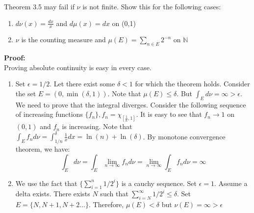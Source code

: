 \documentclass[notoc]{tufte-book}
\begin{document}
\begin{tcolorbox}[colback=c4,colframe=c3,title=Problem 3.10]
	Theorem 3.5 may fail if $\nu$ is not finite. Show this for the following cases:
	\begin{enumerate}
		\item $d\nu(x)=\frac{dx}{x}$ and $d\mu(x)=dx$ on (0,1)
		\item $\nu$ is the counting measure and $\mu(E)=\sum_{n\in E}2^{-n}$ on $\mathbb{N}$
	\end{enumerate}
\end{tcolorbox}
\textbf{Proof: }\\
Proving absolute continuity is easy in every case.
\begin{enumerate}
	\item Set $\epsilon=1/2$. Let there exist some $\delta<1$ for which the theorem holds. Consider the set $E=(0,\min(\delta,1))$. Note that $\mu(E)\leq \delta$. But $\int_E d\nu=\infty>\epsilon$. We need to prove that the integral diverges. Consider the following sequence of increasing functions $\{f_n\},f_n=\chi_{[\frac{1}{n},1]}$. It is easy to see that $f_n\to 1$ on $(0,1)$ and $f_n$ is increasing. Note that $\int_E f_nd\nu=\int_{1/n}^\delta\frac{1}{x}dx=\ln(n)+\ln(\delta)$. By monotone convergence theorem, we have:
	$$\int_Ed\nu=\int_E\lim_{n\to\infty} f_nd\nu=\lim_{n\to\infty}\int_E f_nd\nu=\infty$$
	\item We use the fact that $\{\sum_{i=1}^n1/2^i\}$ is a cauchy sequence. Set $\epsilon=1$. Assume a delta exists. There exists $N$ such that $\sum_{i=N}^\infty 1/2^i\leq \delta$. Set $E=\{N,N+1,N+2\hdots\}$. Therefore, $\mu(E)<\delta$ but $\nu(E)=\infty>\epsilon$   
\end{enumerate}






\backmatter





\printindex
\end{document}
